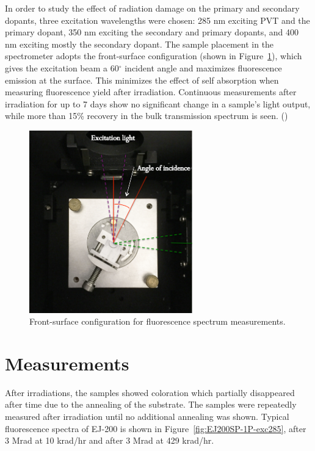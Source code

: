 \documentclass[preprint,12pt]{elsarticle}
\begin{document}
In order to study the effect of radiation damage on the primary and secondary dopants, three excitation wavelengths were chosen: 
285 nm 	exciting PVT and the primary dopant, 
350 nm exciting the secondary and primary dopants, 
and 400 nm exciting mostly the secondary dopant. 
The sample placement in the spectrometer adopts the front-surface configuration (shown in Figure~\ref{fig:sample_placement}), 
which gives the excitation beam a 60$^\circ$ incident angle and maximizes fluorescence emission at the surface. 
This minimizes the effect of self absorption when measuring fluorescence yield after irradiation. 
Continuous measurements after irradiation for up to 7 days show no significant change in a sample's light output, 
while more than 15\% recovery in the bulk transmission spectrum is seen. ({\color{red}{should I show plots about this in the appendix?}}) 
\begin{figure}[!ht]
	\centering
	\includegraphics[width=200pt]{./figures/sample_placement.png}
	\caption{Front-surface configuration for fluorescence spectrum measurements.}
	\label{fig:sample_placement}
\end{figure}

\section{Measurements} 
After irradiations, the samples showed coloration which partially disappeared after time due to the annealing of the substrate. 
The samples were repeatedly measured after irradiation until no additional annealing was shown. 
Typical fluorescence spectra of EJ-200 is shown in Figure~\ref{fig:EJ200SP-1P-exc285}, 
after 3 Mrad at 10 krad/hr and after 3 Mrad at 429 krad/hr.
\end{document}
